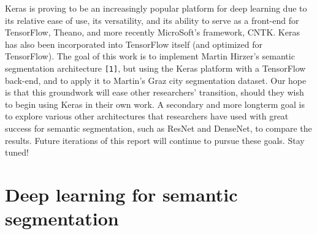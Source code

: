 Keras is proving to be an increasingly popular platform for deep learning due to its 
relative ease of use, its versatility, and its ability to serve as a front-end for
TensorFlow, Theano, and more recently MicroSoft's framework, CNTK. Keras has also been 
incorporated into TensorFlow itself (and optimized for TensorFlow). The goal of this 
work is to implement Martin Hirzer's semantic segmentation architecture \verb|[1]|, but 
using the Keras platform with a TensorFlow back-end, and to apply it to Martin's Graz city 
segmentation dataset. Our hope is that this groundwork will ease other researchers' transition, 
should they wish to begin using Keras in their own work. A secondary and more longterm  goal 
is to explore various other architectures that researchers have used with great success for 
semantic segmentation, such as ResNet and DenseNet, to compare the results. Future 
iterations of this report will continue to pursue these goals. Stay tuned!


\section{Deep learning for semantic segmentation}

